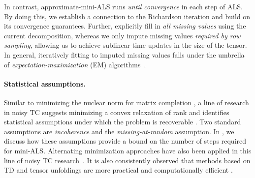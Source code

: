 In contrast, approximate-mini-ALS runs \emph{until convergence} in each step of ALS.
By doing this, we establish a connection to the Richardson iteration
and build on its convergence guarantees.
Further, \citet{tomasi2005parafac} explicitly fill in \emph{all missing values} using the current decomposition, whereas we only impute missing values \emph{required by row sampling},
allowing us to achieve sublinear-time updates in the size of the tensor.
In general, iteratively fitting to imputed missing values falls under the umbrella of \emph{expectation-maximization} (EM) algorithms~\citep[Chapter 8]{little2019statistical}.

\paragraph{Statistical assumptions.}
Similar to minimizing the nuclear norm for matrix completion \citep{fazel2002matrix, candes2012exact}, a line of research in noisy TC suggests minimizing a convex relaxation of rank and identifies statistical assumptions under which the problem is recoverable \citep{barak2016noisy}.
Two standard assumptions are \emph{incoherence} and the \emph{missing-at-random} assumption. %
In , we discuss how these assumptions provide a bound on the number of steps required for mini-ALS.
Alternating minimization approaches have also been applied
in this line of noisy TC research~\citep{jain2014provable,liu2020tensor}.
It is also consistently observed that methods based on TD and tensor unfoldings are more practical and computationally efficient \citep{acar2011scalable,montanari2018spectral,filipovic2015tucker,shah2019iterative,shah2023robust}.